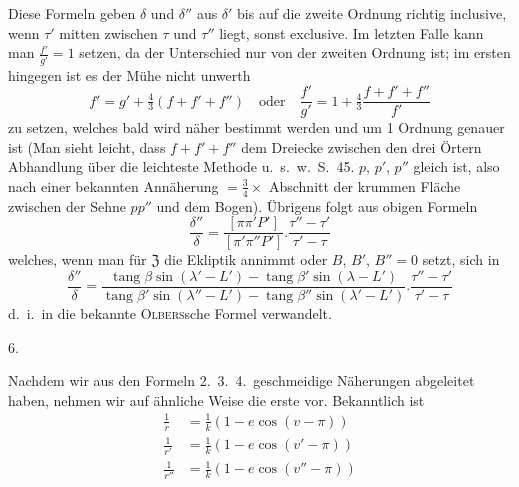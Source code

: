 Diese Formeln geben $\delta$ und $\delta''$ aus $\delta'$ bis auf die zweite Ordnung richtig inclusive, wenn $\tau'$ mitten zwischen $\tau$ und $\tau''$ liegt, sonst exclusive. Im letzten Falle kann man $\frac{f'}{g'}=1$ setzen, da der Unterschied nur von der zweiten Ordnung ist; im ersten hingegen ist es der Mühe nicht unwerth
\[
f'=g'+\tfrac43(f+f'+f'')\quad\text{oder}\quad\frac{f'}{g'}=1+\tfrac43\frac{f+f'+f''}{f'}
\]
zu setzen, welches bald wird näher bestimmt werden und um 1 Ordnung genauer ist (Man sieht leicht, dass $f+f'+f''$ dem Dreiecke zwischen den drei Örtern
%
\expandafter\def\csname HistoricalNoteText10\endcsname{Abhandlung über die leichteste Methode u.\ s.\ w.\ S.\ 45.}%
$p$, $p'$, $p''$ gleich ist, also nach einer bekannten Annäherung $=\frac34\times$ Abschnitt der krummen Fläche zwischen der Sehne $pp''$ und dem Bogen). Übrigens folgt aus obigen Formeln
\[
\frac{\delta''}{\delta}=\frac{[\pi\pi'P']}{[\pi'\pi''P']}.\frac{\tau''-\tau'}{\tau'-\tau}
\]
welches, wenn man für $\mathfrak{Z}$ die Ekliptik annimmt oder $B$, $B'$, $B''=0$ setzt, sich in
\[
\frac{\delta''}{\delta}=\frac{\operatorname{tang}\beta\sin(\lambda'-L')-\operatorname{tang}\beta'\sin(\lambda-L')}{\operatorname{tang}\beta'\sin(\lambda''-L')-\operatorname{tang}\beta''\sin(\lambda'-L')}.\frac{\tau''-\tau'}{\tau'-\tau}
\]
d.\ i.\ in die bekannte \textsc{Olbers}sche Formel verwandelt.

\begin{center}6.\end{center}
Nachdem wir aus den Formeln 2.\ 3.\ 4.\ geschmeidige Näherungen abgeleitet haben, nehmen wir auf ähnliche Weise die erste vor. Bekanntlich ist
\[
\begin{aligned}
\frac1r&=\frac1k(1-e\cos(v-\pi))\\
\frac1{r'}&=\frac1k(1-e\cos(v'-\pi))\\
\frac1{r''}&=\frac1k(1-e\cos(v''-\pi))
\end{aligned}
\]

